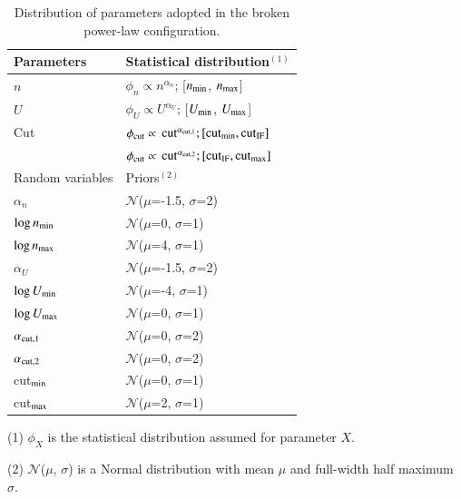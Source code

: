 \documentclass{aa}
\begin{document}
\begin{table}[t!]
\begin{threeparttable}
\centering
\caption[Distribution of parameters adopted in the broken power-law configuration.]{Distribution of parameters adopted in the broken power-law configuration.}
\label{table_broken_plaw}

\begin{tabular}{p{}p{}}

\hline
Parameters & Statistical distribution$^{(1)}$ \\ \hline 
$n$ & $\phi_{n} \propto n^{\alpha_n}$; [$n_{\rm min}$, $n_{\rm max}$]\\
\hline
$U$ & $\phi_U \propto U^{\alpha_U}$; [$U_{\rm min}$, $U_{\rm max}$]\\
\hline
Cut & 
    $\phi_{\rm cut} \propto$ ${\rm cut}^{\alpha_{\rm cut,1}}; [{\rm cut}_{\rm min}, {\rm cut}_{\rm IF}]$\\
    & $\phi_{\rm cut} \propto$ ${\rm cut}^{\alpha_{\rm cut,2}}; [{\rm cut}_{\rm IF}, {\rm cut}_{\rm max}]$\\
\hline
\hline
Random variables & Priors$^{(2)}$ \\ \hline 
$\alpha_n$ & $\mathcal{N}$($\mu$=-1.5, $\sigma$=2)\\
$\log n_{\rm min}$ & $\mathcal{N}$($\mu$=0, $\sigma$=1)\\
$\log n_{\rm max}$ & $\mathcal{N}$($\mu$=4, $\sigma$=1)\\
\hline
$\alpha_U$ & $\mathcal{N}$($\mu$=-1.5, $\sigma$=2)\\
$\log U_{\rm min}$ & $\mathcal{N}$($\mu$=-4, $\sigma$=1)\\
$\log U_{\rm max}$ & $\mathcal{N}$($\mu$=0, $\sigma$=1)\\
\hline
$\alpha_{\rm cut,1}$ & $\mathcal{N}$($\mu$=0, $\sigma$=2)\\
$\alpha_{\rm cut,2}$ & $\mathcal{N}$($\mu$=0, $\sigma$=2)\\
cut$_{\rm min}$ & $\mathcal{N}$($\mu$=0, $\sigma$=1)\\
cut$_{\rm max}$ & $\mathcal{N}$($\mu$=2, $\sigma$=1)\\
\hline
\end{tabular}

\begin{tablenotes}
    \footnotesize
   \item (1) $\phi_X$ is the statistical distribution assumed for parameter $X$.
   \item (2) $\mathcal{N}$($\mu$, $\sigma$) is a Normal distribution with mean $\mu$ and full-width half maximum $\sigma$.
\end{tablenotes}

\end{threeparttable}
\end{table}
\end{document}
